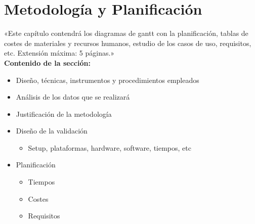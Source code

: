 \chapter{Metodología y Planificación}
«Este capítulo contendrá los diagramas de gantt con la planificación, tablas de costes de materiales y recursos humanos, estudio de los casos de uso, requisitos, etc. Extensión máxima: 5 páginas.»\\

\textbf{Contenido de la sección:}
\begin{itemize}
    \item Diseño, técnicas, instrumentos y procedimientos empleados
    \item Análisis de los datos que se realizará
    \item Justificación de la metodología
    \item Diseño de la validación
    \begin{itemize}
        \item Setup, plataformas, hardware, software, tiempos, etc
    \end{itemize}
    \item Planificación
    \begin{itemize}
        \item Tiempos
        \item Costes
        \item Requisitos
    \end{itemize}
\end{itemize}

